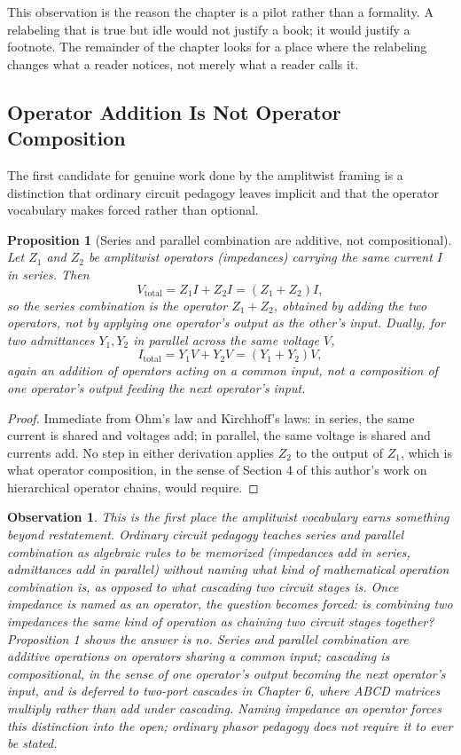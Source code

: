 \documentclass[12pt]{article}
\newtheorem{proposition}{Proposition}
\newtheorem{observation}{Observation}
\begin{document}
This observation is the reason the chapter is a pilot rather than a formality. A relabeling that is true but idle would not justify a book; it would justify a footnote. The remainder of the chapter looks for a place where the relabeling changes what a reader notices, not merely what a reader calls it.

\subsection{Operator Addition Is Not Operator Composition}

The first candidate for genuine work done by the amplitwist framing is a distinction that ordinary circuit pedagogy leaves implicit and that the operator vocabulary makes forced rather than optional.

\begin{proposition}[Series and parallel combination are additive, not compositional]
Let $Z_1$ and $Z_2$ be amplitwist operators (impedances) carrying the same current $I$ in series. Then
\[
V_{\text{total}} = Z_1 I + Z_2 I = (Z_1 + Z_2) I,
\]
so the series combination is the operator $Z_1 + Z_2$, obtained by \emph{adding} the two operators, not by applying one operator's output as the other's input. Dually, for two admittances $Y_1, Y_2$ in parallel across the same voltage $V$,
\[
I_{\text{total}} = Y_1 V + Y_2 V = (Y_1 + Y_2) V,
\]
again an addition of operators acting on a common input, not a composition of one operator's output feeding the next operator's input.
\end{proposition}

\begin{proof}
Immediate from Ohm's law and Kirchhoff's laws: in series, the same current is shared and voltages add; in parallel, the same voltage is shared and currents add. No step in either derivation applies $Z_2$ to the output of $Z_1$, which is what operator composition, in the sense of Section 4 of this author's work on hierarchical operator chains, would require.
\end{proof}

\begin{observation}
This is the first place the amplitwist vocabulary earns something beyond restatement. Ordinary circuit pedagogy teaches series and parallel combination as algebraic rules to be memorized (impedances add in series, admittances add in parallel) without naming what kind of mathematical operation combination \emph{is}, as opposed to what cascading two circuit stages is. Once impedance is named as an operator, the question becomes forced: is combining two impedances the same kind of operation as chaining two circuit stages together? Proposition 1 shows the answer is no. Series and parallel combination are additive operations on operators sharing a common input; cascading is compositional, in the sense of one operator's output becoming the next operator's input, and is deferred to two-port cascades in Chapter 6, where ABCD matrices multiply rather than add under cascading. Naming impedance an operator forces this distinction into the open; ordinary phasor pedagogy does not require it to ever be stated.
\end{observation}
\end{document}
